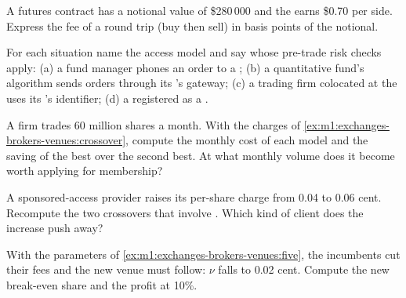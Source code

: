 \begin{exercise}[$\star$]\label{exo:m1:exchanges-brokers-venues:2}
A futures contract has a notional value of \$280\,000 and the  earns
\$0.70 per side. Express the fee of a round trip (buy then sell) in basis
points of the notional.
\end{exercise}

\begin{exercise}[$\star$]\label{exo:m1:exchanges-brokers-venues:3}
For each situation name the access model and say whose pre-trade risk checks
apply: (a) a fund manager phones an order to a ; (b) a
quantitative fund's algorithm sends orders through its 's gateway;
(c) a trading firm colocated at the  uses its 's identifier;
(d) a  registered as a .
\end{exercise}

\begin{exercise}[$\star\star$]\label{exo:m1:exchanges-brokers-venues:4}
A firm trades 60 million shares a month. With the charges of
\cref{ex:m1:exchanges-brokers-venues:crossover}, compute the monthly cost of
each model and the saving of the best over the second best. At what monthly
volume does it become worth applying for membership?
\end{exercise}

\begin{exercise}[$\star\star$]\label{exo:m1:exchanges-brokers-venues:5}
A sponsored-access provider raises its per-share charge from 0.04 to 0.06
cent. Recompute the two crossovers that involve . Which kind
of client does the increase push away?
\end{exercise}

\begin{exercise}[$\star\star$]\label{exo:m1:exchanges-brokers-venues:6}
With the parameters of \cref{ex:m1:exchanges-brokers-venues:five}, the
incumbents cut their fees and the new venue must follow: $\nu$ falls to 0.02
cent. Compute the new break-even share and the profit at 10\%.
\end{exercise}


